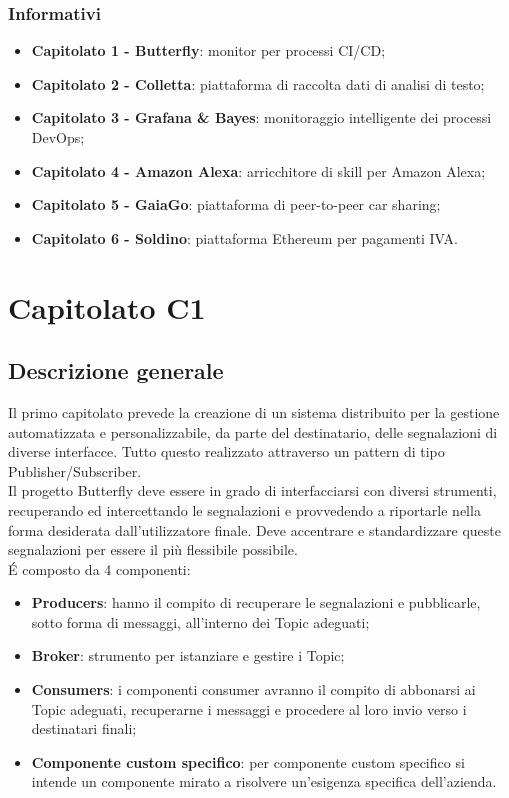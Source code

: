 \documentclass[11pt,a4paper]{article}
\begin{document}
		\subsubsection{Informativi}
		\begin{itemize}
		\item\textbf{Capitolato 1 - Butterfly}: monitor per processi CI/CD;
		\item\textbf{Capitolato 2 - Colletta}: piattaforma di raccolta dati di analisi di testo;
		\item\textbf{Capitolato 3 - Grafana \& Bayes}: monitoraggio intelligente dei processi DevOps;
		\item\textbf{Capitolato 4 - Amazon Alexa}: arricchitore di skill per Amazon Alexa;
		\item\textbf{Capitolato 5 - GaiaGo}: piattaforma di peer-to-peer car sharing;
		\item\textbf{Capitolato 6 - Soldino}: piattaforma Ethereum per pagamenti IVA. 
		\end{itemize}
	
	\newpage	
	\section{Capitolato C1}
	\subsection{Descrizione generale}
	Il primo capitolato prevede la creazione di un sistema distribuito per la gestione automatizzata e personalizzabile, da parte del destinatario, delle segnalazioni di diverse interfacce. Tutto questo realizzato attraverso un pattern di tipo Publisher/Subscriber. \\
	Il progetto Butterfly deve essere in grado di interfacciarsi con diversi strumenti, recuperando ed intercettando le segnalazioni e provvedendo a riportarle nella forma desiderata dall'utilizzatore finale. Deve accentrare e standardizzare queste segnalazioni per essere il più flessibile possibile.\\
	\'E composto da 4 componenti:
	\begin{itemize}
		\item \textbf{Producers}: hanno il compito di recuperare le segnalazioni e pubblicarle, sotto forma di messaggi, all'interno dei Topic adeguati;
		\item \textbf{Broker}: strumento per istanziare e gestire i Topic;
		\item \textbf{Consumers}: i componenti consumer avranno il compito di abbonarsi ai Topic adeguati, recuperarne i	messaggi e procedere al loro invio verso i destinatari finali;
		\item \textbf{Componente custom specifico}: per componente custom specifico si intende un componente mirato a risolvere un'esigenza specifica dell'azienda. 
	\end{itemize}
\end{document}
